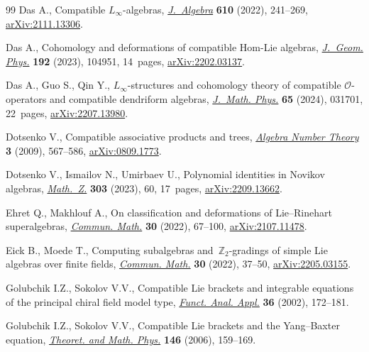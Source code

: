 \begin{thebibliography}{99}
Das A., Compatible {$L_\infty$}-algebras, \href{https://doi.org/10.1016/j.jalgebra.2022.07.020}{\textit{J.~Algebra}} \textbf{610}
 (2022), 241--269, \href{https://arxiv.org/abs/2111.13306}{arXiv:2111.13306}.

Das A., Cohomology and deformations of compatible {H}om-{L}ie algebras,
 \href{https://doi.org/10.1016/j.geomphys.2023.104951}{\textit{J.~Geom. Phys.}} \textbf{192} (2023), 104951, 14~pages,
 \href{https://arxiv.org/abs/2202.03137}{arXiv:2202.03137}.

Das A., Guo S., Qin Y., {$L_\infty$}-structures and cohomology theory of
 compatible {$\mathcal{O}$}-operators and compatible dendriform algebras,
 \href{https://doi.org/10.1063/5.0161898}{\textit{J.~Math. Phys.}} \textbf{65} (2024), 031701, 22~pages,
 \href{https://arxiv.org/abs/2207.13980}{arXiv:2207.13980}.

Dotsenko V., Compatible associative products and trees, \href{https://doi.org/10.2140/ant.2009.3.567}{\textit{Algebra Number
 Theory}} \textbf{3} (2009), 567--586, \href{https://arxiv.org/abs0809.1773}{arXiv:0809.1773}.

Dotsenko V., Ismailov N., Umirbaev U., Polynomial identities in {N}ovikov
 algebras, \href{https://doi.org/10.1007/s00209-023-03231-8}{\textit{Math.~Z.}} \textbf{303} (2023), 60, 17~pages,
 \href{https://arxiv.org/abs/2209.13662}{arXiv:2209.13662}.

Ehret Q., Makhlouf A., On classification and deformations of {L}ie--{R}inehart
 superalgebras, \href{https://doi.org/10.46298/cm.10537}{\textit{Commun. Math.}} \textbf{30} (2022), 67--100,
 \href{https://arxiv.org/abs/2107.11478}{arXiv:2107.11478}.

Eick B., Moede T., Computing subalgebras and~{$\mathbb Z_2$}-gradings of simple
 {L}ie algebras over finite fields, \href{https://doi.org/10.46298/cm.10193}{\textit{Commun. Math.}} \textbf{30} (2022),
 37--50, \href{https://arxiv.org/abs/2205.03155}{arXiv:2205.03155}.

Golubchik I.Z., Sokolov V.V., Compatible {L}ie brackets and integrable
 equations of the principal chiral field model type, \href{https://doi.org/10.1023/A:1020141820038}{\textit{Funct. Anal.
 Appl.}} \textbf{36} (2002), 172--181.

Golubchik I.Z., Sokolov V.V., Compatible {L}ie brackets and the
 {Y}ang--{B}axter equation, \href{https://doi.org/10.1007/s11232-006-0016-6}{\textit{Theoret. and Math. Phys.}} \textbf{146}
 (2006), 159--169.


\end{thebibliography}
